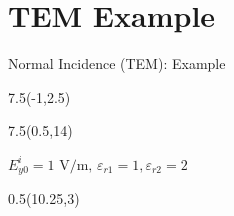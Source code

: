\section{TEM Example}
\begin{frame}{Normal Incidence (TEM): Example}
\begin{textblock}{7.5}(-1,2.5) 
\scalebox{0.99}{
	
}

\end{textblock}

\begin{textblock}{7.5}(0.5,14) 
\begin{center}
	$E^i_{y0} = 1\text{  V/m, } \varepsilon_{r1} = 1, \varepsilon_{r2} = 2 $
\end{center}
\end{textblock}
\begin{textblock}{0.5}(10.25,3)
	{\color{Blue4}{\rule{1.5pt}{2.8in}}}
\end{textblock}


\end{frame}

